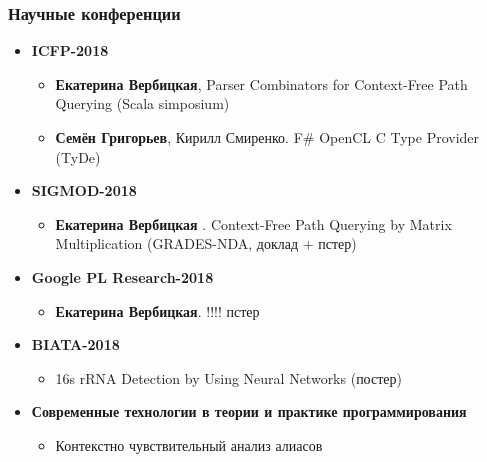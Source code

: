 \documentclass[xcolor=table]{beamer}
\begin{document}
\begin{frame}[fragile]
  \transwipe[direction=90]
  \frametitle{Научные конференции}
\begin{itemize}

      \item \textbf{ICFP-2018}
      \begin{itemize}
        \item \textbf{Екатерина Вербицкая}, Parser Combinators for Context-Free Path Querying (Scala simposium)
        \item \textbf{Семён Григорьев}, Кирилл Смиренко. F\# OpenCL C Type Provider (TyDe)
      \end{itemize}

      \item \textbf{SIGMOD-2018}
      \begin{itemize}
        \item \textbf{Екатерина Вербицкая} . Context-Free Path Querying by Matrix Multiplication (GRADES-NDA, доклад + пстер)
      \end{itemize}
      
      \item \textbf{Google PL Research-2018}
      \begin{itemize}
        \item \textbf{Екатерина Вербицкая}. !!!! пстер
      \end{itemize}

      \item \textbf{BIATA-2018}
      \begin{itemize}
         \item 16s rRNA Detection by Using Neural Networks (постер)
      \end{itemize}
      
      \item \textbf{Современные технологии в теории и практике программирования}
      \begin{itemize}
         \item Контекстно чувствительный анализ алиасов
      \end{itemize}

\end{itemize}
\end{frame}
 
\end{document}
